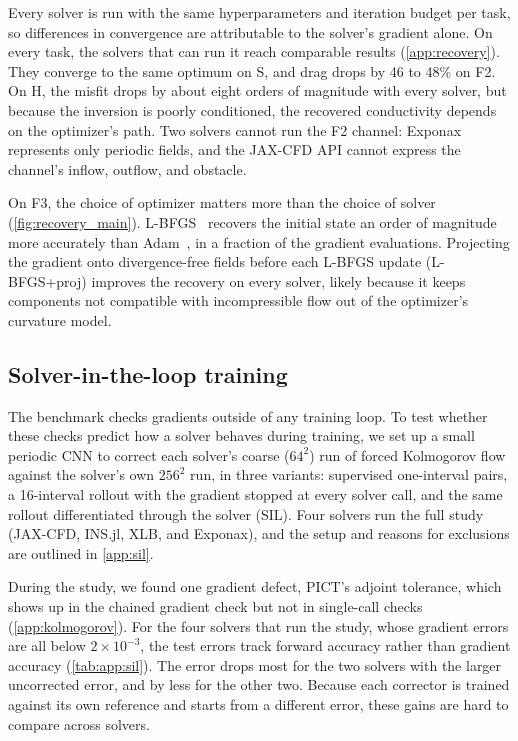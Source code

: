 Every solver is run with the same hyperparameters and iteration budget per
task, so differences in convergence are attributable to the solver's
gradient alone. On every task, the solvers that can run it reach
comparable results (\cref{app:recovery}). They converge to the same optimum
on S, and drag drops by 46 to 48\% on F2. On H, the misfit drops by about eight orders of magnitude with every solver,
but because the inversion is poorly conditioned,
the recovered conductivity depends on the optimizer's path. Two solvers cannot run the F2 channel:
Exponax represents only periodic fields, and the JAX-CFD API cannot express the channel's inflow,
outflow, and obstacle.

On F3, the choice of optimizer matters more than the choice of solver
(\cref{fig:recovery_main}). L-BFGS~\cite{byrd1995limited} recovers the initial state an order of
magnitude more accurately than Adam~\cite{kingma2015adam}, in a fraction of the gradient
evaluations. Projecting the gradient onto divergence-free fields before each
L-BFGS update (L-BFGS+proj) improves the recovery on every solver, likely because it
keeps components not compatible with incompressible flow out of the optimizer's
curvature model.

\subsection{Solver-in-the-loop training}
\label{sec:sil}

The benchmark checks gradients outside of any training loop. To test
whether these checks predict how a solver behaves during training, we set up a
small periodic CNN to correct each solver's coarse ($64^2$) run of forced
Kolmogorov flow against the solver's own $256^2$ run, in three variants:
supervised one-interval pairs, a 16-interval rollout with the gradient
stopped at every solver call, and the same rollout differentiated through
the solver (SIL). Four solvers run the full study (JAX-CFD, INS.jl, XLB, and
Exponax), and the setup and reasons for exclusions are outlined in \cref{app:sil}.

During the study, we found one gradient defect, PICT's adjoint tolerance, which
shows up in the chained gradient check but not in single-call checks
(\cref{app:kolmogorov}). For the four solvers that run the study, whose
gradient errors are all below $2\times10^{-3}$, the test errors track forward
accuracy rather than gradient accuracy (\cref{tab:app:sil}). The error drops
most for the two solvers with the larger uncorrected error, and by less for the
other two. Because each corrector is trained against its own reference and starts from
a different error, these gains are hard to compare across solvers.

